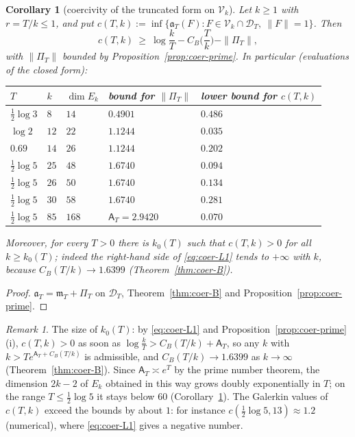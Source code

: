 \documentclass[11pt]{amsart}
\newtheorem{corollary}[theorem]{Corollary}
\theoremstyle{definition}
\theoremstyle{remark}
\newtheorem{remark}[theorem]{Remark}
\newcommand{\Aconst}{\mathsf A_T}
\newcommand{\PiT}{\Pi_T}
\newcommand{\mT}{\mathfrak m_T}
\begin{document}
\begin{corollary}[coercivity of the truncated form on $\mathcal V_k$]\label{cor:coer-L1}
Let $k\ge1$ with $r=T/k\le1$, and put $c(T,k):=\inf\{\mathfrak a_T(F):F\in\mathcal V_k\cap\mathcal D_T,\ \|F\|=1\}$. Then
\begin{equation}\label{eq:coer-L1}
c(T,k)\ \ge\ \log\frac kT-C_B\Big(\frac Tk\Big)-\|\PiT\| ,
\end{equation}
with $\|\PiT\|$ bounded by Proposition~\ref{prop:coer-prime}. In particular (evaluations of the closed form):
\begin{center}
\begin{tabular}{@{}lllll@{}}
\toprule
$T$ & $k$ & $\dim E_k$ & bound for $\|\PiT\|$ & lower bound for $c(T,k)$\\
\midrule
$\frac12\log3$ & $8$ & $14$ & $0.4901$ & $0.486$\\
$\log2$ & $12$ & $22$ & $1.1244$ & $0.035$\\
$0.69$ & $14$ & $26$ & $1.1244$ & $0.202$\\
$\frac12\log5$ & $25$ & $48$ & $1.6740$ & $0.094$\\
$\frac12\log5$ & $26$ & $50$ & $1.6740$ & $0.134$\\
$\frac12\log5$ & $30$ & $58$ & $1.6740$ & $0.281$\\
$\frac12\log5$ & $85$ & $168$ & $\Aconst=2.9420$ & $0.070$\\
\bottomrule
\end{tabular}
\end{center}
Moreover, for every $T>0$ there is $k_0(T)$ such that $c(T,k)>0$ for all $k\ge k_0(T)$; indeed the right-hand side
of \eqref{eq:coer-L1} tends to $+\infty$ with $k$, because $C_B(T/k)\to1.6399$ (Theorem~\ref{thm:coer-B}).
\end{corollary}
\begin{proof}
$\mathfrak a_T=\mT+\PiT$ on $\mathcal D_T$, Theorem~\ref{thm:coer-B} and Proposition~\ref{prop:coer-prime}.
\end{proof}

\begin{remark}\label{rem:coer-size}
The size of $k_0(T)$: by \eqref{eq:coer-L1} and Proposition~\ref{prop:coer-prime}(i), $c(T,k)>0$ as soon as
$\log\frac kT>C_B(T/k)+\Aconst$, so any $k$ with $k>Te^{\Aconst+C_B(T/k)}$ is admissible, and $C_B(T/k)\to1.6399$ as
$k\to\infty$ (Theorem~\ref{thm:coer-B}). Since $\Aconst\asymp e^T$ by the prime number theorem, the dimension $2k-2$ of $E_k$
obtained in this way grows doubly exponentially in $T$; on the range $T\le\frac12\log5$ it stays below $60$
(Corollary~\ref{cor:coer-L1}). The Galerkin values of $c(T,k)$ exceed the bounds by about $1$: for instance
$c(\frac12\log5,13)\approx1.2$ (numerical), where \eqref{eq:coer-L1} gives a negative number.
\end{remark}
\end{document}
